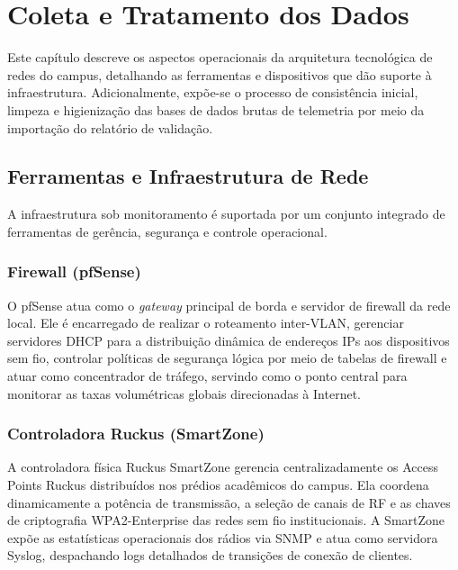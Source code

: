 \chapter{Coleta e Tratamento dos Dados}
\label{cap:coleta}

Este capítulo descreve os aspectos operacionais da arquitetura tecnológica de redes do campus, detalhando as ferramentas e dispositivos que dão suporte à infraestrutura. Adicionalmente, expõe-se o processo de consistência inicial, limpeza e higienização das bases de dados brutas de telemetria por meio da importação do relatório de validação.

\section{Ferramentas e Infraestrutura de Rede}
\label{sec:coleta_ferramentas}

A infraestrutura sob monitoramento é suportada por um conjunto integrado de ferramentas de gerência, segurança e controle operacional.

\subsection{Firewall (pfSense)}
O pfSense atua como o \textit{gateway} principal de borda e servidor de firewall da rede local. Ele é encarregado de realizar o roteamento inter-VLAN, gerenciar servidores DHCP para a distribuição dinâmica de endereços IPs aos dispositivos sem fio, controlar políticas de segurança lógica por meio de tabelas de firewall e atuar como concentrador de tráfego, servindo como o ponto central para monitorar as taxas volumétricas globais direcionadas à Internet.

\subsection{Controladora Ruckus (SmartZone)}
A controladora física Ruckus SmartZone gerencia centralizadamente os Access Points Ruckus distribuídos nos prédios acadêmicos do campus. Ela coordena dinamicamente a potência de transmissão, a seleção de canais de RF e as chaves de criptografia WPA2-Enterprise das redes sem fio institucionais. A SmartZone expõe as estatísticas operacionais dos rádios via SNMP e atua como servidora Syslog, despachando logs detalhados de transições de conexão de clientes.

